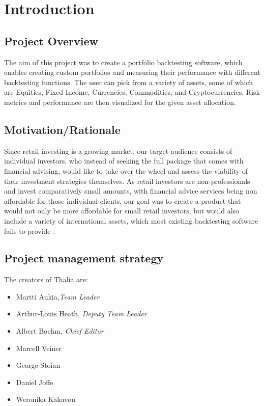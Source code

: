 \documentclass[main.tex]{subfiles}
\begin{document}
\section{Introduction}
\subsection {Project Overview}

The aim of this project was to create a portfolio backtesting software, which enables creating custom portfolios and measuring their performance with different backtesting functions. The user can pick from a variety of assets, some of which are Equities, Fixed Income, Currencies, Commodities, and Cryptocurrencies. Risk metrics and performance are then visualized for the given asset allocation.
\subsection{Motivation/Rationale}
Since retail investing is a growing market, our target audience consists of individual investors, who instead of seeking the full package that comes with financial advising, would like to take over the wheel and assess the viability of their investment strategies themselves. As retail investors are non-professionals and invest comparatively small amounts, with financial advice services being non affordable for those individual clients, our goal was to create a product that would not only be more affordable for small retail investors, but would also include a variety of international assets, which most existing backtesting software fails to provide \cite{WP}.

\subsection{Project management strategy}

The creators of Thalia are:
\begin{itemize}
    \item Martti Aukia,\textit{Team Leader}
    \item Arthur-Louis Heath, \textit{Deputy Team Leader}
	\item Albert Boehm, \textit{Chief Editor}
	\item Marcell Veiner
	\item George Stoian
	\item Daniel Joffe
	\item Weronika Kakavou
\end{itemize}
\end{document}
